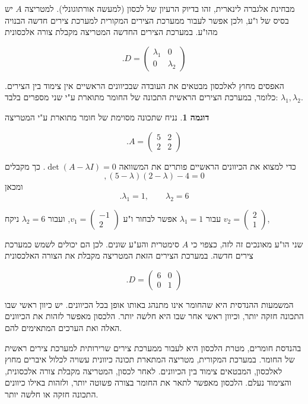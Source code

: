 \documentclass[12pt]{report}
\theoremstyle{plain}
\theoremstyle{definition}
\newtheorem{example}{דוגמה}[chapter]
\newcommand{\0}{\mathbf{0}}
\begin{document}
מבחינת אלגברה לינארית, זהו בדיוק הרעיון של לכסון (למעשה אורתוגונלי).
למטריצה
$A$
יש בסיס של ו"ע, ולכן אפשר לעבור ממערכת הצירים המקורית למערכת צירים חדשה הבנויה מהו"ע.
במערכת הצירים החדשה המטריצה מקבלת צורה אלכסונית

$$
.D =
\begin{pmatrix}
\lambda_1 & 0 \\
0 & \lambda_2
\end{pmatrix}
$$

האפסים מחוץ לאלכסון מבטאים את העובדה שבכיוונים הראשיים אין צימוד בין הצירים.
כלומר, במערכת הצירים הראשית התכונה של החומר מתוארת ע"י שני מספרים בלבד:
$\lambda_1,\lambda_2$.

\begin{example}
נניח שתכונה מסוימת של חומר מתוארת ע"י המטריצה

$$
.A =
\begin{pmatrix}
5 & 2 \\
2 & 2
\end{pmatrix}
$$

כדי למצוא את הכיוונים הראשיים פותרים את המשוואה
$\det(A-\lambda I)=0$.
כך מקבלים
$$
,(5-\lambda)(2-\lambda)-4=0
$$
ומכאן
$$
.\lambda_1=1,
\qquad\lambda_2=6
$$

עבור
$\lambda_1=1$
אפשר לבחור ו"ע
$
v_1=
\begin{pmatrix}
-1 \\
2
\end{pmatrix}
$,
ועבור
$\lambda_2=6$
ניקח
$
v_2=
\begin{pmatrix}
2 \\
1
\end{pmatrix}
$,

שני הו"ע מאונכים זה לזה, כצפוי כי 
$A$
סימטרית והע"ע שונים. לכן הם יכולים לשמש כמערכת צירים חדשה.
במערכת הצירים הזאת המטריצה מקבלת את הצורה האלכסונית

$$
.D =
\begin{pmatrix}
6 & 0 \\
0 & 1
\end{pmatrix}
$$

המשמעות ההנדסית היא שהחומר אינו מתנהג באותו אופן בכל הכיוונים.
יש כיוון ראשי שבו התכונה חזקה יותר, וכיוון ראשי אחר שבו היא חלשה יותר.
הלכסון מאפשר לזהות את הכיוונים האלה ואת הערכים המתאימים להם.
\end{example}

בהנדסת חומרים, מטרת הלכסון היא לעבור ממערכת צירים שרירותית למערכת צירים ראשית של החומר.
במערכת המקורית, מטריצה המתארת תכונה כיוונית עשויה לכלול איברים מחוץ לאלכסון, המבטאים צימוד בין הכיוונים. לאחר לכסון, המטריצה מקבלת צורה אלכסונית, והצימוד נעלם.
הלכסון מאפשר לתאר את החומר בצורה פשוטה יותר, ולזהות באילו כיוונים התכונה חזקה או חלשה יותר.
\end{document}
